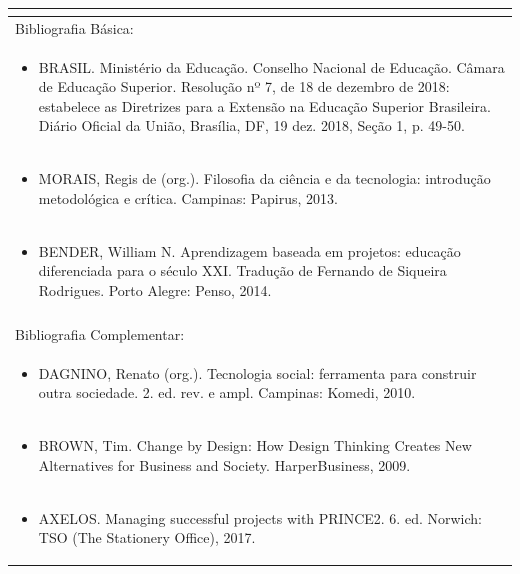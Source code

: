 \documentclass[11pt]{article}
\begin{document}
\begin{center}
\begin{longtable}{|p{4cm}|p{4cm}|p{4cm}|p{4cm}|}
\multicolumn{4}{|p{\dimexpr 16cm + 6\tabcolsep\relax}|}{}\\
\hline
\multicolumn{4}{|p{16cm}|}{Bibliografia Básica:}\\*
\multicolumn{4}{|p{\dimexpr 16cm + 6\tabcolsep\relax}|}{\begin{itemize}\item BRASIL. Ministério da Educação. Conselho Nacional de Educação. Câmara de Educação Superior. Resolução nº 7, de 18 de dezembro de 2018: estabelece as Diretrizes para a Extensão na Educação Superior Brasileira. Diário Oficial da União, Brasília, DF, 19 dez. 2018, Seção 1, p. 49-50.\end{itemize}}\\
\multicolumn{4}{|p{\dimexpr 16cm + 6\tabcolsep\relax}|}{\begin{itemize}\item MORAIS, Regis de (org.). Filosofia da ciência e da tecnologia: introdução metodológica e crítica. Campinas: Papirus, 2013.\end{itemize}}\\
\multicolumn{4}{|p{\dimexpr 16cm + 6\tabcolsep\relax}|}{\begin{itemize}\item BENDER, William N. Aprendizagem baseada em projetos: educação diferenciada para o século XXI. Tradução de Fernando de Siqueira Rodrigues. Porto Alegre: Penso, 2014.\end{itemize}}\\
\multicolumn{4}{|p{16cm}|}{}\\
\hline
\multicolumn{4}{|p{16cm}|}{Bibliografia Complementar:}\\*
\multicolumn{4}{|p{\dimexpr 16cm + 6\tabcolsep\relax}|}{\begin{itemize}\item DAGNINO, Renato (org.). Tecnologia social: ferramenta para construir outra sociedade. 2. ed. rev. e ampl. Campinas: Komedi, 2010.\end{itemize}}\\
\multicolumn{4}{|p{\dimexpr 16cm + 6\tabcolsep\relax}|}{\begin{itemize}\item BROWN, Tim. Change by Design: How Design Thinking Creates New Alternatives for Business and Society. HarperBusiness, 2009.\end{itemize}}\\
\multicolumn{4}{|p{\dimexpr 16cm + 6\tabcolsep\relax}|}{\begin{itemize}\item AXELOS. Managing successful projects with PRINCE2. 6. ed. Norwich: TSO (The Stationery Office), 2017.\end{itemize}}\\

\end{longtable}
\end{center}
\end{document}
